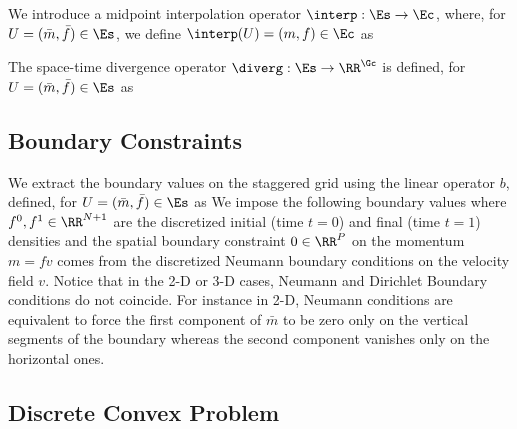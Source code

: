 We introduce a midpoint interpolation operator $\interp : \Es \rightarrow \Ec$,  where, for $U = (\bar m,\bar f) \in \Es$, we define  $\interp(U) = (m,f) \in \Ec$  as


The space-time divergence operator $\diverg : \Es \rightarrow \RR^{\Gc}$ is defined, for $U = (\bar m,\bar f) \in \Es$ as

\subsection{Boundary Constraints}

We extract the boundary values on the staggered grid using the linear operator $b$, defined, for $U = (\bar m,\bar f) \in \Es$ as
We impose the following boundary values 
where $f^0,f^1 \in \RR^{N+1}$ are the discretized initial (time $t=0$) and final (time $t=1$) densities and the spatial boundary constraint $0\in  \RR^{P}$ on the momentum $m=fv$ comes from the discretized  Neumann boundary conditions on the velocity field $v$.  Notice that in the 2-D or 3-D  cases, Neumann and Dirichlet Boundary conditions do not coincide. For instance in 2-D, Neumann conditions are equivalent to force the first component of $\bar m$ to be zero only on the vertical segments of the boundary whereas the second component vanishes only on the horizontal ones.   


\subsection{Discrete Convex Problem}

